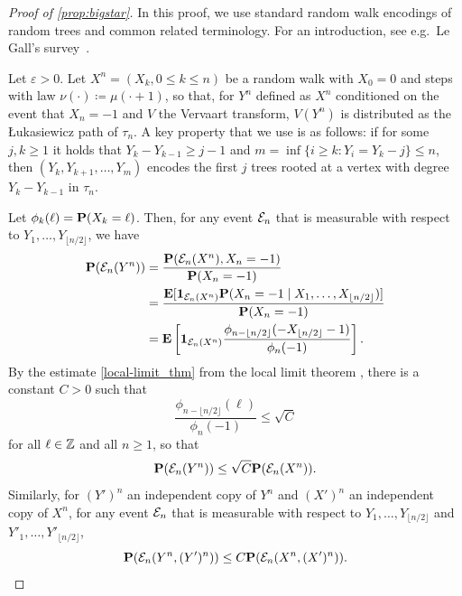 \documentclass[11pt,reqno]{amsart}
\newcommand{\eps}{\varepsilon}
\begin{document}
\begin{proof}[Proof of \cref{prop:bigstar}]
In this proof, we use standard random walk encodings of random trees and common related terminology. For an introduction, see e.g.\ Le Gall's survey~\cite{legall2005random}. 

Let $\eps>0$. Let $X^{n}=(X_k, 0\le k \le n)$ be a random walk with $X_0=0$ and steps with law $\nu(\cdot)\coloneqq \mu(\cdot+1)$, so that, for $Y^n$ defined as $X^n$ conditioned on the event that $X_n=-1$ and $V$ the Vervaart transform, $V(Y^n)$ is distributed as the \L ukasiewicz path of $\tau_n$. A key property that we use is as follows: if for some $j,k\ge 1$ it holds that $Y_k-Y_{k-1}\ge j-1$ and $m=\inf\{i\geq k :Y_i=Y_k-j\}\le n$, then $(Y_k, Y_{k+1},\dots, Y_m)$ encodes the first $j$ trees rooted at a vertex with degree $Y_k-Y_{k-1}$ in $\tau_n$.

Let $\phi_k(\ell)=\P(X_k=\ell)$. Then, for any event $\cE_n$ that is measurable with respect to $Y_1,\dots,Y_{\lfloor n/2\rfloor}$, we have 
\begin{align*}\P(\cE_n(Y^n))&=\frac{\P(\cE_n(X^n),X_n=-1 )}{\P(X_n=-1 )}\\
&=\frac{\E[\one_{\cE_n(X^n)}\P(X_n=-1\mid X_1,\dots,X_{\lfloor n/2\rfloor})]}{\P(X_n=-1 )}\\
&=\E\left[\one_{\cE_n(X^n)}\frac{\phi_{n-\lfloor n/2\rfloor}(-X_{\lfloor n/2\rfloor}-1) }{\phi_n(-1)}
\right].
\end{align*}
By the estimate \eqref{local-limit_thm} from the local limit theorem \cite{petrov2012sums}, there is a constant $C>0$ such that 
\[\frac{\phi_{n-\lfloor n/2\rfloor}(\ell) }{\phi_n(-1)}\le \sqrt{C}\]
for all $\ell\in \Z$ and all $n\ge 1$, so that 
\[\P(\cE_n(Y^n))\le \sqrt{C}\P(\cE_n(X^n) ).\]
Similarly, for $(Y')^n$ an independent copy of $Y^n$ and $(X')^n$ an independent copy of $X^n$, for any event $\cE_n$ that is measurable with respect to $Y_1,\dots,Y_{\lfloor n/2\rfloor}$ and $Y'_1,\dots,Y'_{\lfloor n/2\rfloor}$, 
\begin{equation}
\label{eq:like_independent}
\P(\cE_n(Y^n,(Y')^n))\le C\P(\cE_n(X^n,(X')^n)).
\end{equation}


\end{proof}
\end{document}
